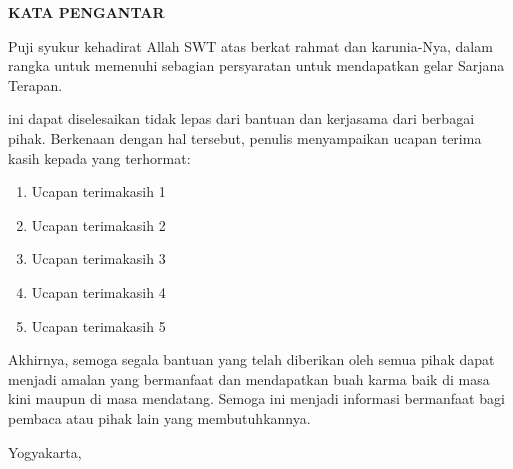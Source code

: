 \clearpage
{}
{}
\begin{center}
    \textbf{\large KATA PENGANTAR}\\[3em]
\end{center}

Puji syukur kehadirat Allah SWT atas berkat rahmat dan karunia-Nya, {\tipe} dalam rangka untuk memenuhi sebagian persyaratan untuk mendapatkan gelar Sarjana Terapan.

{\tipe} ini dapat diselesaikan tidak lepas dari bantuan dan kerjasama dari berbagai pihak. Berkenaan dengan hal tersebut, penulis menyampaikan ucapan terima kasih kepada yang terhormat:

\begin{enumerate}
    \item Ucapan terimakasih 1
    \item Ucapan terimakasih 2
    \item Ucapan terimakasih 3
    \item Ucapan terimakasih 4
    \item Ucapan terimakasih 5
\end{enumerate}

Akhirnya, semoga segala bantuan yang telah diberikan oleh semua pihak dapat menjadi amalan yang bermanfaat dan mendapatkan buah karma baik di masa kini maupun di masa mendatang. Semoga {\tipe} ini menjadi informasi bermanfaat bagi pembaca atau pihak lain yang membutuhkannya.

\begin{flushright}
    Yogyakarta, \tglpengesahan\\[1.25cm]
    {\underline{{\penulis}}} \\
    \nim
\end{flushright}